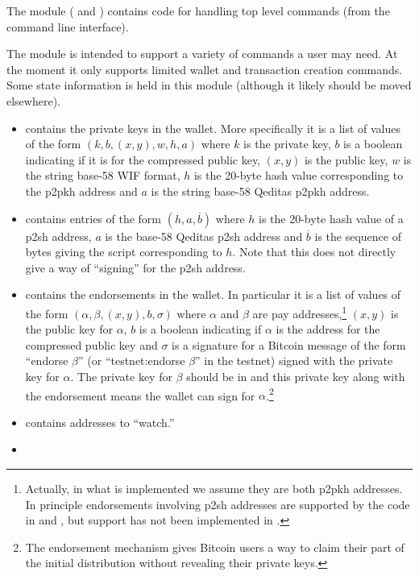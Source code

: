 The {} module ({} and {})
contains code for handling top level commands (from the command line interface).

The module {} is intended to support a variety of commands a user may need.
At the moment it only supports limited wallet and transaction creation commands.
Some state information is held in this module (although it likely should be moved elsewhere).
\begin{itemize}
\item {} contains the private keys in the wallet.
More specifically it is a list of values of the form $(k,b,(x,y),w,h,a)$
where $k$ is the private key, $b$ is a boolean indicating if it is for the compressed public key,
$(x,y)$ is the public key, $w$ is the string base-58 WIF format, $h$ is the 20-byte hash value
corresponding to the p2pkh address and $a$ is the string base-58 Qeditas p2pkh address.
\item {} contains entries of the form $(h,a,\overline{b})$
where $h$ is the 20-byte hash value of a p2sh address, $a$ is the base-58 Qeditas p2sh address
and $\overline{b}$ is the sequence of bytes giving the script corresponding to $h$.
Note that this does not directly give a way of ``signing'' for the p2sh address.
\item {} contains the endorsements in the wallet.
In particular it is a list of values of the form $(\alpha,\beta,(x,y),b,\sigma)$
where $\alpha$ and $\beta$ are pay addresses,\footnote{Actually, in what is implemented we assume they are both p2pkh addresses. In principle endorsements involving p2sh addresses are supported by the code in {} and {}, but support has not been implemented in {}.}
$(x,y)$ is the public key for $\alpha$,
$b$ is a boolean indicating if $\alpha$ is the address for the compressed public key
and $\sigma$ is a signature for a
Bitcoin message of the form ``endorse $\beta$''
(or ``testnet:endorse $\beta$'' in the testnet)
signed with the private key for $\alpha$.
The private key for $\beta$ should be in {}
and this private key along with the endorsement means the wallet can sign for $\alpha$.\footnote{The endorsement mechanism gives Bitcoin users a way to claim their part of the initial distribution without revealing their private keys.}
\item {}
contains addresses to ``watch.'' 
\item {}

\end{itemize}
